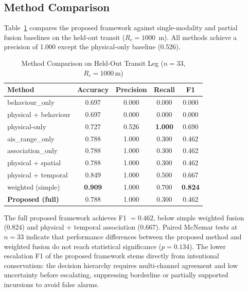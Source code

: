 \documentclass[conference]{IEEEtran}
\begin{document}
\subsection{Method Comparison}
Table~\ref{tab:methods} compares the proposed framework against single-modality and partial fusion baselines on the held-out transit ($R_c = 1000$~m). All methods achieve a precision of 1.000 except the physical-only baseline (0.526).

\begin{table}[!t]
\caption{Method Comparison on Held-Out Transit Leg ($n=33$, $R_c=1000\,\mathrm{m}$)}
\label{tab:methods}
\centering
\footnotesize
\begin{tabular}{@{}lcccc@{}}
\toprule
Method & Accuracy & Precision & Recall & F1 \\
\midrule
behaviour\_only & 0.697 & 0.000 & 0.000 & 0.000 \\
physical + behaviour & 0.697 & 0.000 & 0.000 & 0.000 \\
physical-only & 0.727 & 0.526 & \textbf{1.000} & 0.690 \\
ais\_range\_only & 0.788 & 1.000 & 0.300 & 0.462 \\
association\_only & 0.788 & 1.000 & 0.300 & 0.462 \\
physical + spatial & 0.788 & 1.000 & 0.300 & 0.462 \\
physical + temporal & 0.849 & 1.000 & 0.500 & 0.667 \\
weighted (simple) & \textbf{0.909} & 1.000 & 0.700 & \textbf{0.824} \\
\textbf{Proposed (full)} & 0.788 & 1.000 & 0.300 & 0.462 \\
\bottomrule
\end{tabular}
\end{table}

The full proposed framework achieves F1 $= 0.462$, below simple weighted fusion (0.824) and physical + temporal association (0.667). Paired McNemar tests at $n=33$ indicate that performance differences between the proposed method and weighted fusion do not reach statistical significance ($p = 0.134$). The lower escalation F1 of the proposed framework stems directly from intentional conservatism: the decision hierarchy requires multi-channel agreement and low uncertainty before escalating, suppressing borderline or partially supported incursions to avoid false alarms.
\end{document}
